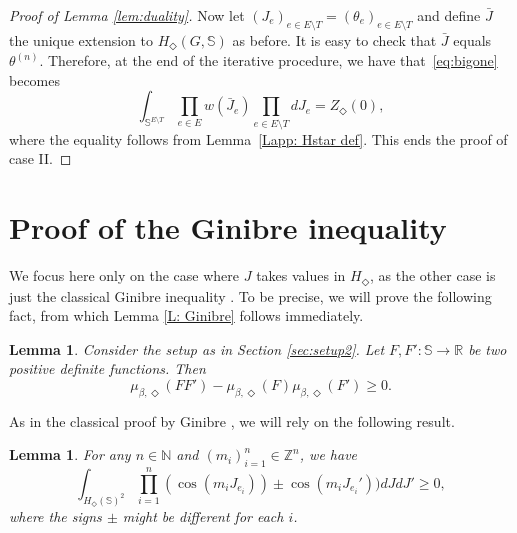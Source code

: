\documentclass[11pt, reqno]{amsart}
\newtheorem{lemma}[theorem]{Lemma}
\numberwithin{equation}{section}
\theoremstyle{definition}
\theoremstyle{remark}
\newcommand{\ZZ}{\mathbb{Z}}
\newcommand{\NN}{\mathbb{N}}
\newcommand{\RR}{\mathbb{R}}
\newcommand{\J}{J}
\newcommand{\coclosed}{\Diamond}
\newcommand{\Hstar}{\ensuremath{H_{\Diamond}} }
\begin{document}
\begin{proof}[Proof of Lemma \ref{lem:duality}]
		Now let $(J_e)_{e \in E \setminus T} = (\theta_e)_{e \in E \setminus T}$ and define $\bar{J}$ the unique extension to $\Hstar(G, \mathbb{S})$ as before. 
		It is easy to check that $\bar{J}$ equals $\theta^{(n)}$. 
		Therefore, at the end of the iterative procedure, we have that~\eqref{eq:bigone} becomes
		\[
			 \int_{\mathbb S^{E\setminus T}} \prod_{e \in E}w(\bar J_e)\prod_{e \in E \setminus T} {d}J_e=Z_{\coclosed}(0), 
		\]
		where the equality follows from Lemma~\ref{Lapp: Hstar def}. This ends the proof of case II.
\end{proof}

\section{Proof of the Ginibre inequality} \label{ap:Gin}
We focus here only on the case where $\J$ takes values in $\Hstar$, as the other case is just the classical Ginibre inequality \cite{Gin}. 
To be precise, we will prove the following fact, from which Lemma \ref{L: Ginibre} follows immediately. 

\begin{lemma}\label{L: Ginibre 2}
	Consider the setup as in Section \ref{sec:setup2}. Let $F, F': \mathbb{S} \to \RR$ be two positive definite functions. Then 
	\[
		\mu_{\beta, \coclosed}(FF') - \mu_{\beta, \coclosed}(F)\mu_{\beta, \coclosed}(F') \geq 0. 
	\]
\end{lemma}

As in the classical proof by Ginibre \cite{Gin}, we will rely on the following result. 

\begin{lemma} \label{L: Ginibre core}
	For any $n \in \NN$ and $(m_i)_{i = 1}^n \in \ZZ^n$, we have 
	\[
		\int_{\Hstar(\mathbb{S})^2} \prod_{i = 1}^n (\cos(m_i\J_{e_i}))  \pm \cos(m_i\J_{e_i}'))d\J d \J' \geq 0, 
	\]
	where the signs $\pm$ might be different for each $i$.
\end{lemma}
\end{document}
